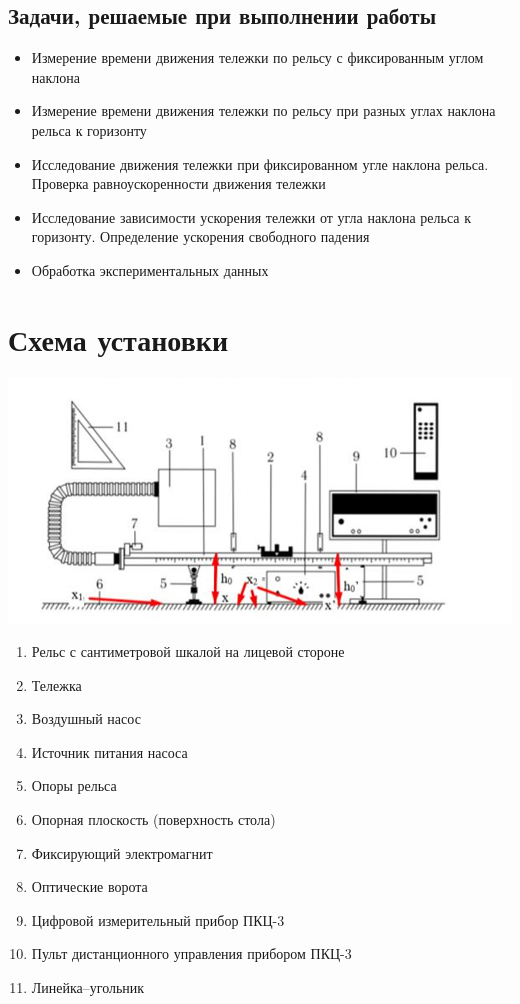 \documentclass[12pt,a4paper]{article}
\begin{document}
\subsection{Задачи, решаемые при выполнении работы}
\begin{itemize}
    \item Измерение времени движения тележки по рельсу с фиксированным углом наклона
    \item Измерение времени движения тележки по рельсу при разных углах наклона рельса к горизонту
    \item Исследование движения тележки при фиксированном угле наклона рельса. Проверка равноускоренности движения тележки
    \item Исследование зависимости ускорения тележки от угла наклона рельса к горизонту. Определение ускорения свободного падения
    \item Обработка экспериментальных данных
\end{itemize}
\section{Схема установки}
\begin{center}
    \includegraphics*[width=14cm]{setup.png}
\end{center}
\begin{enumerate}
    \item Рельс с сантиметровой шкалой на лицевой стороне
    \item Тележка
    \item Воздушный насос
    \item Источник питания насоса
    \item Опоры рельса
    \item Опорная плоскость (поверхность стола)
    \item Фиксирующий электромагнит
    \item Оптические ворота
    \item Цифровой измерительный прибор ПКЦ-3
    \item Пульт дистанционного управления прибором ПКЦ-3
    \item Линейка–угольник 
\end{enumerate}
\end{document}

